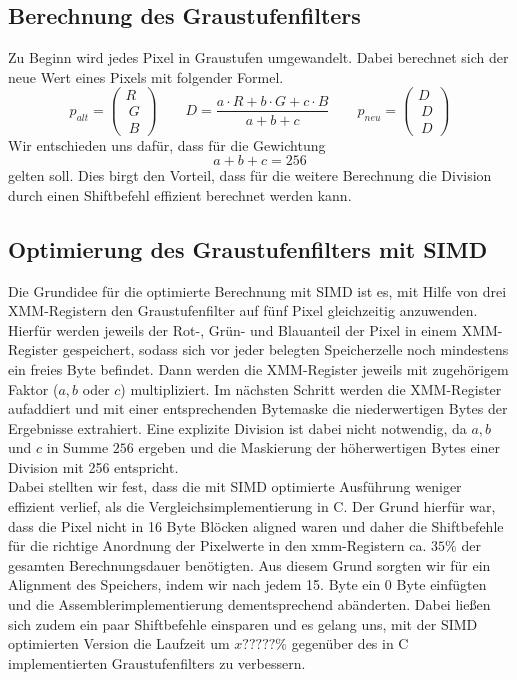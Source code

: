 \documentclass[course=erap]{aspdoc}
\begin{document}
	\subsection{Berechnung des Graustufenfilters}
	Zu Beginn wird jedes Pixel in Graustufen umgewandelt. Dabei berechnet sich der neue Wert eines Pixels mit folgender Formel.
	\begin{equation}
	\label{(1)}
	p_{alt} =  \begin{pmatrix}R \\\ G \\\ B \end{pmatrix} \qquad D = \frac{a \cdot R  + b \cdot G  + c \cdot B }{a + b + c} \qquad p_{neu} =  \begin{pmatrix}D \\\ D \\\ D \end{pmatrix}
	\end{equation}	
	Wir entschieden uns dafür, dass für die Gewichtung \begin{equation}
	a + b + c = 256
	\end{equation} gelten soll. Dies birgt den Vorteil, dass für die weitere Berechnung die Division durch einen Shiftbefehl effizient berechnet werden kann.
	
	\subsection{Optimierung des Graustufenfilters mit SIMD}
	Die Grundidee für die optimierte Berechnung mit SIMD ist es, mit Hilfe von drei XMM-Registern den Graustufenfilter auf fünf Pixel gleichzeitig anzuwenden. Hierfür werden jeweils der Rot-, Grün- und Blauanteil der Pixel in einem XMM-Register gespeichert, sodass sich vor jeder belegten Speicherzelle noch mindestens ein freies Byte befindet. Dann werden die XMM-Register jeweils mit zugehörigem Faktor ($a,b$ oder $c$) multipliziert. Im nächsten Schritt werden die XMM-Register aufaddiert und mit einer entsprechenden Bytemaske die niederwertigen Bytes der Ergebnisse extrahiert. Eine explizite Division ist dabei nicht notwendig, da $a,b$ und $c$ in Summe $256$ ergeben und die Maskierung der höherwertigen Bytes einer Division mit 256 entspricht.
	\\
	\newline
	\noindent
	Dabei stellten wir fest, dass die mit SIMD optimierte Ausführung weniger effizient verlief, als die Vergleichsimplementierung in C. Der Grund hierfür war, dass die Pixel nicht in 16 Byte Blöcken aligned waren und daher die Shiftbefehle für die richtige Anordnung der Pixelwerte in den xmm-Registern ca. $35\%$ der gesamten Berechnungsdauer benötigten. Aus diesem Grund sorgten wir für ein Alignment des Speichers, indem wir nach jedem 15. Byte ein 0 Byte einfügten und die Assemblerimplementierung dementsprechend abänderten. Dabei ließen sich zudem ein paar Shiftbefehle einsparen und es gelang uns, mit der SIMD optimierten Version die Laufzeit um $x?????\%$ %
	gegenüber des in C implementierten Graustufenfilters zu verbessern.  
	
\end{document}
